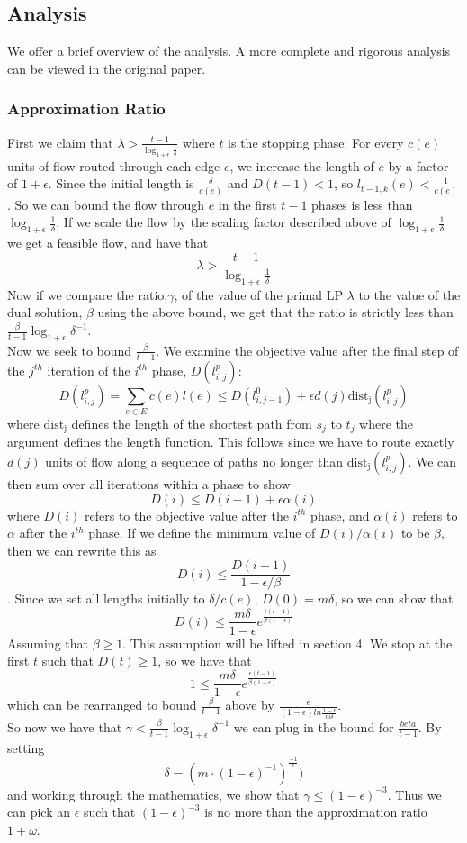\subsection{Analysis}
We offer a brief overview of the analysis. A more complete and
rigorous analysis can be viewed in the original paper. 
\subsubsection{Approximation Ratio}
First we claim
that $\lambda>\frac{t-1}{\log_{1+\epsilon}\frac{1}{\delta}}$ where $t$
is the stopping phase:
For every $c(e)$ units of flow routed through each edge $e$, we
increase the length of $e$ by a factor of $1+\epsilon$. Since the
initial length is $\frac{\delta}{c(e)}$ and $D(t-1)<1$, so
$l_{t-1,k}(e)<\frac{1}{c(e)}$. So we can bound the flow through $e$ in
the first $t-1$ phases is less than
$\log_{1+\epsilon}\frac{1}{\delta}$. If we scale the flow by the scaling
factor described above of $\log_{1+e}\frac{1}{\delta}$ we get a
feasible flow, and have that $$\lambda > \frac{t-1}{\log_{1+\epsilon}\frac{1}{\delta}}$$
Now if we compare the ratio,$\gamma$, of the value of the primal LP $\lambda$ to the value
of the dual solution, $\beta$ using the above bound, we get that the
ratio is strictly less than
$\frac{\beta}{t-1}\log_{1+\epsilon}\delta^{-1}$. \\
Now we seek to bound $\frac{\beta}{t-1}$. We examine
the objective value after the final step of the $j^{th}$ iteration of the $i^{th}$ phase, $D(l_{i,j}^p)$: 
$$D(l_{i,j}^p) = \sum_{e\in E} c(e)l(e) \leq
D(l_{i,j-1}^0)+\epsilon d(j) \mathrm{dist_j}(l_{i,j}^p)$$
where $\mathrm{dist_j}$ defines the length of the shortest path from
$s_j$ to $t_j$ where the argument defines the length function. This
follows since we have to route exactly $d(j)$ units of flow along a
sequence of paths no longer than $\mathrm{dist_j}(l_{i,j}^p)$. We can
then sum over all iterations within a phase to show 
$$D(i)\leq D(i-1)+\epsilon \alpha(i)$$ 
where $D(i)$ refers to the
objective value after the $i^{th}$ phase, and $\alpha(i)$ refers to
$\alpha$ after the $i^{th}$ phase. If we define the minimum value of
$D(i)/\alpha(i)$ to be $\beta$, then we can rewrite this as 
$$D(i)\leq \frac{D(i-1)}{1-\epsilon/\beta}$$. Since we set all lengths
initially to $\delta/c(e)$, $D(0)=m\delta$, so we can show that 
$$D(i)\leq \frac{m\delta}{1-\epsilon} e^{\frac{\epsilon(i-1)}{\beta(1-\epsilon)}}$$
Assuming that $\beta\geq 1$. This assumption will be lifted in section
4.
We stop at the first $t$ such that $D(t)\geq 1$, so we have that 
$$1\leq \frac{m\delta}{1-\epsilon}
e^{\frac{\epsilon(t-1)}{\beta(1-\epsilon)}}$$
which can be rearranged to bound $\frac{\beta}{t-1}$ above by
$\frac{\epsilon}{(1-\epsilon)ln\frac{1-\epsilon}{m\delta}}$.\\
So now we have that
$\gamma<\frac{\beta}{t-1}\log_{1+\epsilon}\delta^{-1}$ we can plug in
the bound for $\frac{beta}{t-1}$. By setting 
$$\delta = (m \cdot (1-\epsilon)^{-1})^{\frac{-1}{\epsilon}})$$
and working through the mathematics, we show that $\gamma \leq
(1-\epsilon)^{-3}$.
Thus we can pick an $\epsilon$ such that $(1-\epsilon)^{-3}$ is no
more than the approximation ratio $1+\omega$. \\
